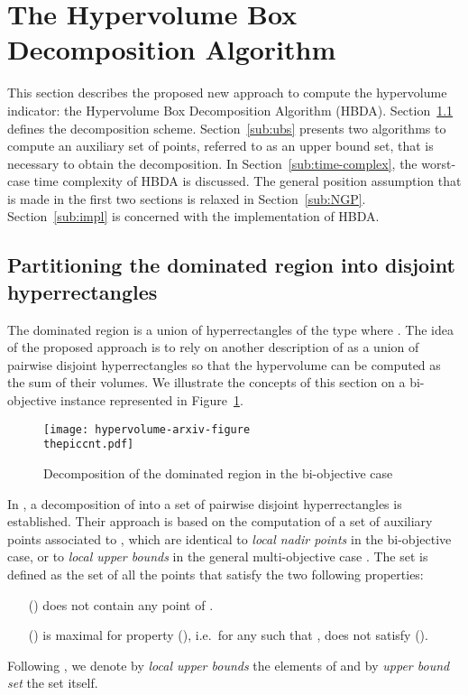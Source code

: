 \documentclass[a4paper,11pt]{article}
\newcommand{\lub}{local upper bound}
\newcommand{\ubs}{upper bound set}
\newcounter{piccnt}
\begin{document}
\section{The Hypervolume Box Decomposition Algorithm}\label{sec:the_approach}

This section describes the proposed new approach to compute the hypervolume indicator:
the Hypervolume Box Decomposition Algorithm (HBDA).
Section~\ref{sub:partition} defines the decomposition scheme.
Section~\ref{sub:ubs} presents two algorithms to compute an auxiliary set of points, 
referred to as an upper bound set, that is necessary to obtain the decomposition.
In Section~\ref{sub:time-complex}, the worst-case time complexity
of HBDA is discussed.
The general position assumption that is made in the first two sections is relaxed in Section~\ref{sub:NGP}.
Section~\ref{sub:impl} is concerned with the implementation of HBDA.

\subsection{Partitioning the dominated region into disjoint hyperrectangles}\label{sub:partition}

The dominated region  is a union of hyperrectangles 
of the type  where . 
The idea of the proposed approach is to rely on another description of 
as a union of pairwise disjoint hyperrectangles
so that the hypervolume can be computed as the sum of their volumes.
We illustrate the concepts of this section on a bi-objective instance represented 
in Figure~\ref{fig:decomp}.


\begin{figure}
  \begin{center}
    \texttt{[image: hypervolume-arxiv-figure\\thepiccnt.pdf]}
  \end{center}
  
  \caption{Decomposition of the dominated region in the bi-objective case
  \label{fig:decomp}}
\end{figure}

In \citet[Section 3]{KapRubShaVer08}, a decomposition of  into a set of pairwise disjoint hyperrectangles
is established.
Their approach is based on the computation of a set  of auxiliary points
associated to , which are identical to \emph{local nadir points} in the bi-objective case,
or to \emph{local upper bounds} in the general multi-objective case \citep[see][]{KlaLacVan15}.
The set  is defined as the set of all the points  that satisfy
the two following properties:
\begin{itemize}[itemindent=20pt,labelsep=10pt,itemsep=\medskipamount]
      \item[()]  does not contain any point of .
  \item[()]  is maximal for property (), i.e.\  for any 
   such that ,  does not satisfy ().
\end{itemize}
Following \citet{KlaLacVan15}, we denote by \emph{\lub{}s} the elements of 
and by \emph{\ubs{}} the set  itself.
\end{document}
